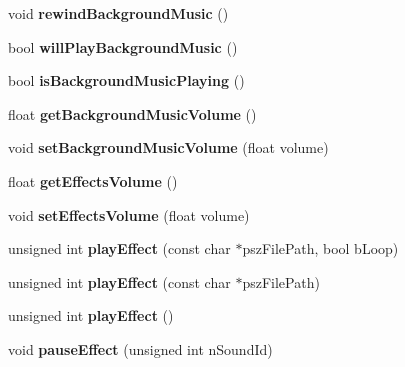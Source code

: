 \begin{DoxyCompactItemize}
void {\bfseries rewind\+Background\+Music} ()
\item 
\mbox{\label{classcocostudio_1_1ComAudio_a8874a5973d8e05807a7ad425f4fcca7e}} 
bool {\bfseries will\+Play\+Background\+Music} ()
\item 
\mbox{\label{classcocostudio_1_1ComAudio_aa8c4cd69fc2fd9b358d2e5c59c037835}} 
bool {\bfseries is\+Background\+Music\+Playing} ()
\item 
\mbox{\label{classcocostudio_1_1ComAudio_a894119d3d57468cda3e376f83bc958b1}} 
float {\bfseries get\+Background\+Music\+Volume} ()
\item 
\mbox{\label{classcocostudio_1_1ComAudio_ab886ff6a1fda9eedb2307bd002c64991}} 
void {\bfseries set\+Background\+Music\+Volume} (float volume)
\item 
\mbox{\label{classcocostudio_1_1ComAudio_a98fee5c597881f63a21641155639bc06}} 
float {\bfseries get\+Effects\+Volume} ()
\item 
\mbox{\label{classcocostudio_1_1ComAudio_ac9b908738eb2cd5f83ba706059dddcfa}} 
void {\bfseries set\+Effects\+Volume} (float volume)
\item 
\mbox{\label{classcocostudio_1_1ComAudio_a93132ee12cf70056221074e237b55340}} 
unsigned int {\bfseries play\+Effect} (const char $\ast$psz\+File\+Path, bool b\+Loop)
\item 
\mbox{\label{classcocostudio_1_1ComAudio_a33a37dc6b86a880e34b61a1ee43255c0}} 
unsigned int {\bfseries play\+Effect} (const char $\ast$psz\+File\+Path)
\item 
\mbox{\label{classcocostudio_1_1ComAudio_a9b59df93194c2ee099b134207b8ac2a6}} 
unsigned int {\bfseries play\+Effect} ()
\item 
\mbox{\label{classcocostudio_1_1ComAudio_a08484065296ea5e64c0991c3f5b334ba}} 
void {\bfseries pause\+Effect} (unsigned int n\+Sound\+Id)

\end{DoxyCompactItemize}
